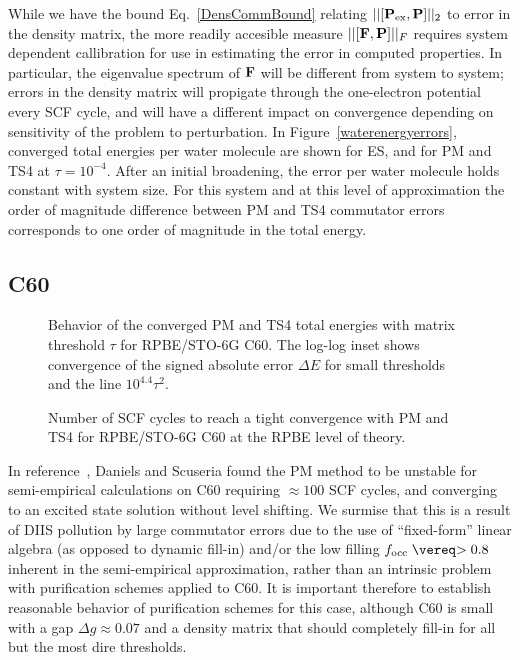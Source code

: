 \commentoutA{\documentclass[prb,aps,twocolumn,twocolumngrid,secnumarabic,superbib,hyperref]{revtex4}}
\begin{document}
While we have the bound Eq.~\ref{DensCommBound} relating $||[{\bf P}_{\rm ex},{\bf P}]||_2$ 
to error in the density matrix, the more readily accesible measure $||[{\bf F},{\bf P}]||_F$
requires  system dependent callibration for use in estimating the error in computed
properties.  In particular, the eigenvalue spectrum of $\bf F$ will be different from
system to system; errors in the density matrix will propigate through the one-electron potential
every SCF cycle, and will have a different impact on convergence depending on sensitivity 
of the problem to perturbation.  In Figure~\ref{waterenergyerrors}, 
converged total energies per water molecule are shown for ES, and for PM and TS4 at
$\tau=10^{-4}$.  After an initial broadening, the error per water molecule 
holds constant with system size.  For this system and at this level of 
approximation the order of magnitude difference between PM and TS4 commutator errors 
corresponds to one order of magnitude in the total energy.  

\subsection{C60}

\begin{figure}[h]
\caption{Behavior of the converged PM and TS4 total energies with matrix threshold $\tau$
         for RPBE/STO-6G C60.  The log-log inset shows 
         convergence of the signed absolute error $\Delta E$ for small 
         thresholds and the line $10^{4.4} \tau^2$.}\label{c60convergence}
\end{figure}

\begin{figure}[h]
\caption{Number of SCF cycles to reach a tight convergence with PM and TS4         
         for RPBE/STO-6G C60 at the RPBE level of theory.}\label{c60SCFs}
\end{figure}


In reference~, Daniels and Scuseria found the PM method to be 
unstable for semi-empirical calculations on C60 requiring  $\approx 100$ SCF
cycles, and converging to an excited state solution without level shifting.  
We surmise that this is a result of DIIS pollution 
by large commutator errors due to the use of ``fixed-form'' 
linear algebra (as opposed to dynamic fill-in) and/or the low filling 
$f_{\rm occ} \gtrsim 0.8$ inherent in the semi-empirical approximation, rather
than an intrinsic problem with purification schemes applied to C60.   
It is important therefore to establish reasonable behavior of purification schemes 
for this case,  although  C60 is small with a gap $\Delta g\approx 0.07$ and a
density matrix that should completely fill-in for all but the most dire thresholds. 
\end{document}
